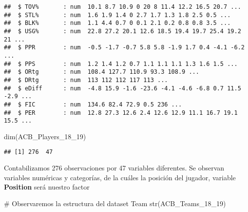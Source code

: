 \documentclass[]{article}
\newenvironment{Shaded}{\begin{snugshade}}{\end{snugshade}}
\newcommand{\KeywordTok}[1]{\textcolor[rgb]{0.94,0.87,0.69}{#1}}
\newcommand{\DecValTok}[1]{\textcolor[rgb]{0.86,0.86,0.80}{#1}}
\newcommand{\CommentTok}[1]{\textcolor[rgb]{0.50,0.62,0.50}{#1}}
\newcommand{\NormalTok}[1]{\textcolor[rgb]{0.80,0.80,0.80}{#1}}
\begin{document}
\begin{verbatim}
##  $ TOV%       : num  10.1 8.7 10.9 0 20 8 11.4 12.2 16.5 20.7 ...
##  $ STL%       : num  1.6 1.9 1.4 0 2.7 1.7 1.3 1.8 2.5 0.5 ...
##  $ BLK%       : num  1.1 4.4 0.7 0 0.1 2.1 0.2 0.8 0.8 3.5 ...
##  $ USG%       : num  22.8 27.2 20.1 12.6 18.5 19.4 19.7 25.4 19.2 21 ...
##  $ PPR        : num  -0.5 -1.7 -0.7 5.8 5.8 -1.9 1.7 0.4 -4.1 -6.2 ...
##  $ PPS        : num  1.2 1.4 1.2 0.7 1.1 1.1 1.1 1.3 1.6 1.5 ...
##  $ ORtg       : num  108.4 127.7 110.9 93.3 108.9 ...
##  $ DRtg       : num  113 112 112 117 113 ...
##  $ eDiff      : num  -4.8 15.9 -1.6 -23.6 -4.1 -4.6 -6.8 0.7 11.5 -2.9 ...
##  $ FIC        : num  134.6 82.4 72.9 0.5 236 ...
##  $ PER        : num  12.8 27.3 12.6 2.4 12.6 12.9 11.1 16.7 19.1 15.5 ...
\end{verbatim}

\begin{Shaded}
\begin{Highlighting}[]
\KeywordTok{dim}\NormalTok{(ACB_Players_18_}\DecValTok{19}\NormalTok{)}
\end{Highlighting}
\end{Shaded}

\begin{verbatim}
## [1] 276  47
\end{verbatim}

Contabilizamos 276 observaciones por 47 variables diferentes. Se
observan variables numéricas y categorías, de la cuáles la posición del
jugador, variable \textbf{Position} será nuestro factor

\begin{Shaded}
\begin{Highlighting}[]
\CommentTok{# Observaremos la estructura del dataset Team}
\KeywordTok{str}\NormalTok{(ACB_Teams_18_}\DecValTok{19}\NormalTok{)}
\end{Highlighting}
\end{Shaded}
\end{document}
